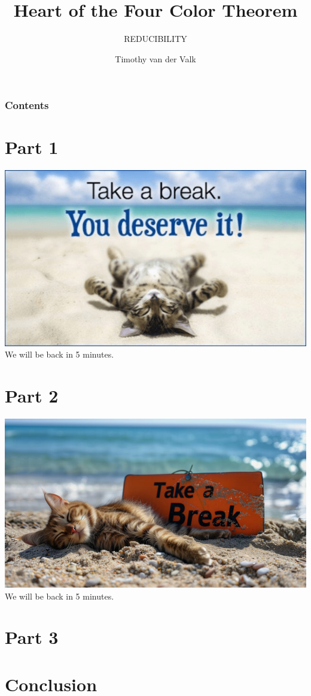 \documentclass{beamer}
\title{Heart of the Four Color Theorem}
\subtitle{\small REDUCIBILITY\vspace{-0.5cm}}
\author{Timothy van der Valk\vspace{0.5cm}}
\date{}
\begin{document}
\frame{\titlepage}



\begin{frame}
\frametitle{Contents}
\tableofcontents
\end{frame}

\section{Part 1}


\begin{frame}
    \includegraphics[width=\textwidth]{images/break1.png}
    We will be back in 5 minutes.
\end{frame}

\section{Part 2}

\begin{frame}
    \includegraphics[width=\textwidth]{images/break2.jpg}
    We will be back in 5 minutes.
\end{frame}

\section{Part 3}


\section{Conclusion}

\end{document}
